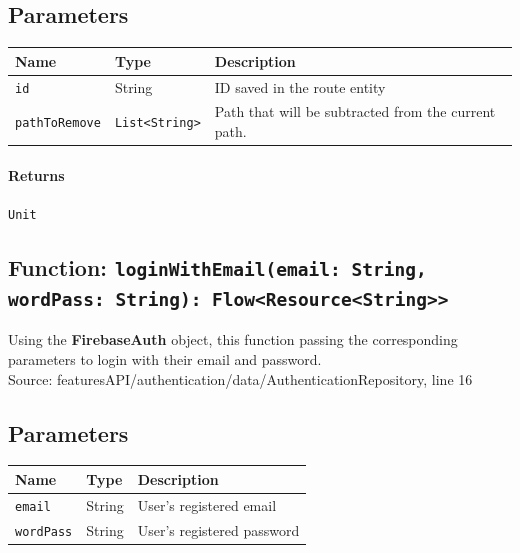 \documentclass{article}
\begin{document}
                \subsection*{Parameters}

                \begin{tabular}{p{3cm} p{4cm} p{7cm}}
                \toprule
                \textbf{Name} & \textbf{Type} & \textbf{Description} \\ \midrule
                \texttt{id} & String & ID saved in the route entity \\ \addlinespace
                \texttt{pathToRemove} & \texttt{List<String>} & Path that will be subtracted from the current path. \\ \bottomrule
                \end{tabular}

                \paragraph{Returns} \texttt{Unit} 

            \hrulefill

            \newpage
    
            \subsection*{Function: \texttt{loginWithEmail(email: String, wordPass: String): Flow<Resource<String>>}}

                Using the \textbf{FirebaseAuth} object, this function passing the 
                corresponding parameters to login with their email and password.\\
                Source: featuresAPI/authentication/data/AuthenticationRepository, line 16
                
                \subsection*{Parameters}

                \begin{tabular}{p{3cm} p{4cm} p{7cm}}
                \toprule
                \textbf{Name} & \textbf{Type} & \textbf{Description} \\ \midrule
                \texttt{email} & String & User's registered email \\ \addlinespace
                \texttt{wordPass} & String & User's registered password \\ \bottomrule
                \end{tabular}
\end{document}

